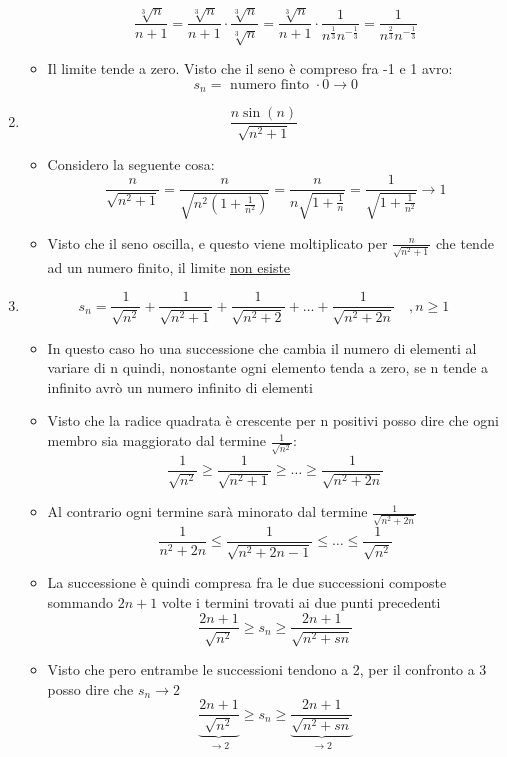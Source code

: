 \documentclass[12pt,a4paper,oneside]{article}
\begin{document}
\begin{enumerate}
\begin{itemize}
		\[
		\frac{\sqrt[3]{n} }{n+1} = \frac{\sqrt[3]{n} }{n+1} \cdot \frac{\sqrt[3]{n}}{\sqrt[3]{n}} = \frac{\sqrt[3]{n} }{n+1} \cdot \frac{1}{n ^{\frac{1}{3}} n^{-\frac{1}{3}}} = \frac{1}{n^{\frac{2}{3}} n ^{-\frac{1}{3}}}
		\] 
		\item Il limite tende a zero. Visto che il seno è compreso fra -1 e 1 avro:
		\[
		s_n = \text{ numero finto } \cdot 0 \to 0
		\] 
	\end{itemize}
	\item 
	\[
	\frac{n \sin\left( n \right) }{\sqrt{n^2 + 1} }
	\] 
	\begin{itemize}
		\item Considero la seguente cosa:
		\[
		\frac{n}{\sqrt{n^2 +1}}= \frac{n}{\sqrt{n^2\left( 1 + \frac{1}{n^2} \right)}} = \frac{n}{n\sqrt{1+\frac{1}{n}}} = \frac{1}{\sqrt{1+\frac{1}{n^2}}} \to 1
		\] 
		\item Visto che il seno oscilla, e questo viene moltiplicato per $\frac{n}{\sqrt{n^2 +1} }$ che tende ad un numero finito, il limite \underline{non esiste}
	\end{itemize}
	\item 
	\[
	s_n = \frac{1}{\sqrt{n^2}} + \frac{1}{\sqrt{ n^2 +1} } + \frac{1}{\sqrt{n^2+2} } + \ldots + \frac{1}{\sqrt{n^2 + 2n} } \quad , n\ge 1
	\] 
	\begin{itemize}
		\item In questo caso ho una successione che cambia il numero di elementi al variare di n quindi, nonostante ogni elemento tenda a zero, se n tende a infinito avrò un numero infinito di elementi
		\item Visto che la radice quadrata è crescente per n positivi posso dire che ogni membro sia maggiorato dal termine $\frac{1}{\sqrt{n^2} }$:
		\[
		\frac{1}{\sqrt{n^2} } \ge \frac{1}{\sqrt{n^2 + 1} } \ge \ldots \ge \frac{1}{\sqrt{n^2 + 2n} }
		\] 
		\item Al contrario ogni termine sarà minorato dal termine $\frac{1}{\sqrt{n^2 + 2n} }$ 
		\[
		\frac{1}{n^2 + 2n} \le \frac{1}{\sqrt{n^2 + 2n -1} } \le \ldots \le \frac{1}{\sqrt{n^2} }
		\] 
		\item La successione è quindi compresa fra le due successioni composte sommando $2n+1$ volte i termini trovati ai due punti precedenti 
		\[
		\frac{2n+1}{\sqrt{n^2} } \ge s_n \ge \frac{2n + 1}{\sqrt{n^2 + sn} }
		\] 
		\item Visto che pero entrambe le successioni tendono a 2, per il confronto a 3 posso dire che $s_n \to 2$
	\[
		\underbrace{\frac{2n+1}{\sqrt{n^2} }}_{ \to 2} \ge s_n \ge \underbrace{\frac{2n + 1}{\sqrt{n^2 + sn} }}_{ \to 2}
\]
\end{itemize}
\end{enumerate}
\end{document}
